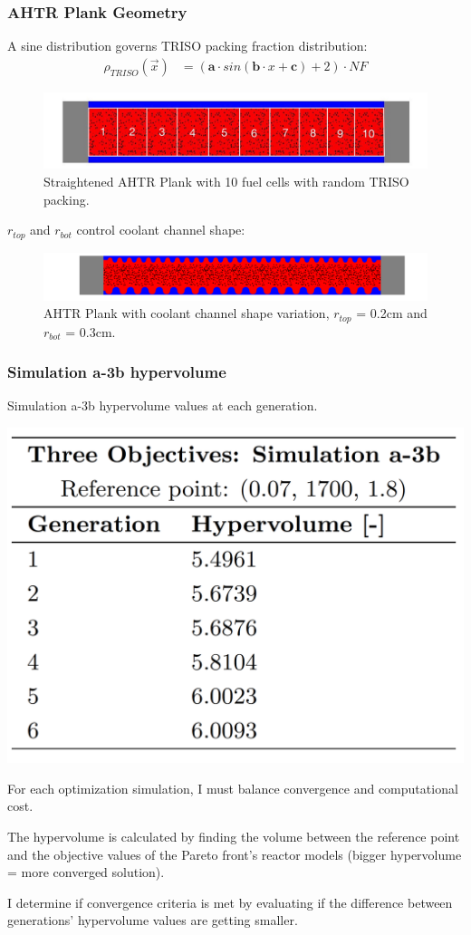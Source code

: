 \begin{frame}
    \frametitle{AHTR Plank Geometry}
    A sine distribution governs TRISO packing fraction distribution: 
    \begin{align}
        \rho_{TRISO}(\vec{x}) &= \left(\textbf{a}\cdot sin(\textbf{b}\cdot x + \textbf{c}) + 2\right) \cdot NF \nonumber
    \end{align}
    \begin{figure}
        \includegraphics[width=0.9\linewidth]{../docs/figures/straightened_plank.png} 
        \caption{Straightened AHTR Plank with 10 fuel cells with random TRISO packing.}
    \end{figure}
    $r_{top}$ and $r_{bot}$ control coolant channel shape: 
    \begin{figure}
        \includegraphics[width=\linewidth]{../docs/figures/coolant-channel-shape.png} 
        \caption{AHTR Plank with coolant channel shape variation, $r_{top}$ = 0.2cm and 
        $r_{bot}$ = 0.3cm.}
    \end{figure}
\end{frame}

\begin{frame}
    \frametitle{Simulation a-3b hypervolume}
    \begin{table}
        \caption{Simulation a-3b hypervolume values at each generation.}
        \includegraphics[width=0.4\linewidth]{figures/a-3b-hypervolume.png} 
    \end{table}

    For each optimization simulation, I must balance convergence and computational cost.

    The hypervolume is calculated by finding the volume between the reference point and 
    the objective values of the Pareto front's reactor models (bigger hypervolume = 
    more converged solution).

    I determine if convergence criteria is met by evaluating if the difference between 
    generations' hypervolume values are getting smaller.
\end{frame}